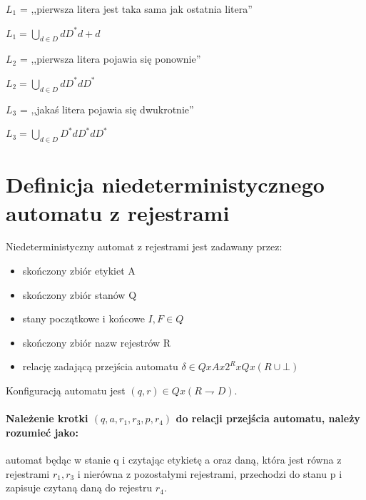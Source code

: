 \documentclass[a4paper,12pt]{report}
\begin{document}
$L_1$ = ,,pierwsza litera jest taka sama jak ostatnia litera''

$L_1 = {\bigcup \limits _{d \in D} dD^*d + d}$

$L_2$ = ,,pierwsza litera pojawia się ponownie''

$L_2 = {\bigcup \limits _{d \in D} dD^*dD^*}$

$L_3$ = ,,jakaś litera pojawia się dwukrotnie''

$L_3 = {\bigcup \limits _{d \in D} D^*dD^*dD^*}$

\section {Definicja niedeterministycznego automatu z rejestrami}
Niedeterministyczny automat z rejestrami jest zadawany przez:
\begin{itemize}
\item skończony zbiór etykiet A
\item skończony zbiór stanów Q
\item stany początkowe i końcowe $I,F \in Q$
\item skończony zbiór nazw rejestrów R
\item relację zadającą przejścia automatu $\delta 
\in Q x A x 2^R x Q x (R \cup \bot)$
\end{itemize}

Konfiguracją automatu jest $(q,r) \in Q x (R \rightharpoondown D)$.

\paragraph {Należenie krotki $(q,a,r_1,r_3,p,r_4)$ do relacji przejścia automatu, należy rozumieć jako:} automat będąc w stanie q i czytając etykietę a oraz daną, która jest równa z rejestrami $r_1,r_3$ i nierówna z pozostałymi rejestrami, przechodzi do stanu p i zapisuje czytaną daną do rejestru $r_4$.
\end{document}
